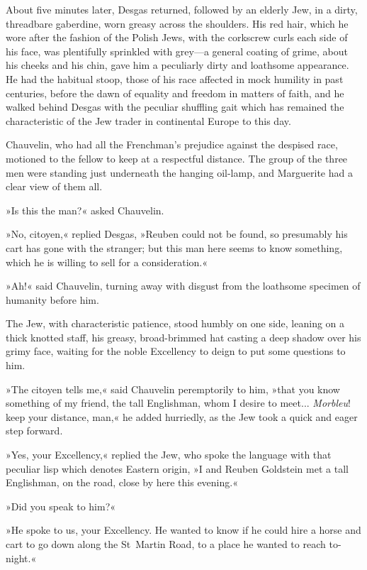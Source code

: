 About five minutes later, Desgas returned, followed by an elderly Jew, in a dirty, threadbare gaberdine, worn greasy across the shoulders. His red hair, which he wore after the fashion of the Polish Jews, with the corkscrew curls each side of his face, was plentifully sprinkled with grey\allowbreak---\allowbreak a general coating of grime, about his cheeks and his chin, gave him a peculiarly dirty and loathsome appearance. He had the habitual stoop, those of his race affected in mock humility in past centuries, before the dawn of equality and freedom in matters of faith, and he walked behind Desgas with the peculiar shuffling gait which has remained the characteristic of the Jew trader in continental Europe to this day.

Chauvelin, who had all the Frenchman's prejudice against the despised race, motioned to the fellow to keep at a respectful distance. The group of the three men were standing just underneath the hanging oil-lamp, and Marguerite had a clear view of them all.

»Is this the man?« asked Chauvelin.

»No, citoyen,« replied Desgas, »Reuben could not be found, so presumably his cart has gone with the stranger; but this man here seems to know something, which he is willing to sell for a consideration.«

»Ah!« said Chauvelin, turning away with disgust from the loathsome specimen of humanity before him.

The Jew, with characteristic patience, stood humbly on one side, leaning on a thick knotted staff, his greasy, broad-brimmed hat casting a deep shadow over his grimy face, waiting for the noble Excellency to deign to put some questions to him.

»The citoyen tells me,« said Chauvelin peremptorily to him, »that you know something of my friend, the tall Englishman, whom I desire to meet... \textit{Morbleu}! keep your distance, man,« he added hurriedly, as the Jew took a quick and eager step forward.

»Yes, your Excellency,« replied the Jew, who spoke the language with that peculiar lisp which denotes Eastern origin, »I and Reuben Goldstein met a tall Englishman, on the road, close by here this evening.«

»Did you speak to him?«

»He spoke to us, your Excellency. He wanted to know if he could hire a horse and cart to go down along the St~Martin Road, to a place he wanted to reach to-night.«

